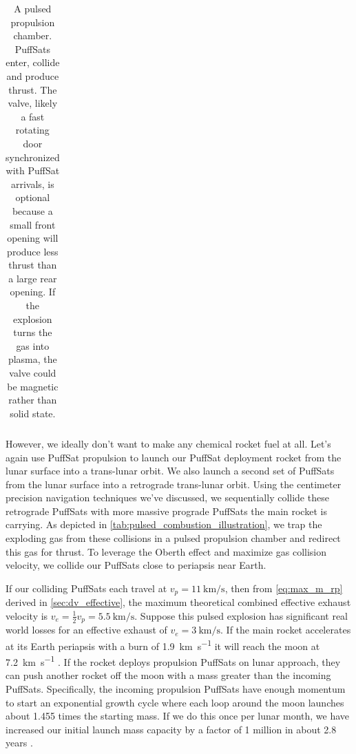 \documentclass{article}
\begin{document}
{\begin{table}[htpb!]
\begin{tabular}{|c|c|}
    \end{tabular}
    \caption{A pulsed propulsion chamber.   PuffSats enter, collide and produce thrust.   The valve, likely a fast rotating door synchronized with PuffSat arrivals, is optional because a small front opening will produce less thrust than a large rear opening.  If the explosion turns the gas into plasma, the valve could be magnetic rather than solid state.}
    \label{tab:pulsed_combustion_illustration}
\end{table}

However, we ideally don't want to make any chemical rocket fuel at all.   Let's again use PuffSat propulsion to launch our PuffSat deployment rocket from the lunar surface into a trans-lunar orbit.   We also launch a second set of PuffSats from the lunar surface into a retrograde trans-lunar orbit.   Using the centimeter precision navigation techniques we've discussed, we sequentially collide these retrograde PuffSats with more massive prograde PuffSats the main rocket is carrying.  As depicted in \autoref{tab:pulsed_combustion_illustration}, we trap the exploding gas from these collisions in a pulsed propulsion chamber and redirect this gas for thrust.   To leverage the Oberth effect and maximize gas collision velocity, we collide our PuffSats close to periapsis near Earth.

If our colliding PuffSats each travel at $v_p=\SI{11}{\kilo\meter\per\second}$, then from \autoref{eq:max_m_rp} derived in \autoref{sec:dv_effective},  the maximum theoretical combined effective exhaust velocity is $v_e = \frac{1}{2}v_p = \SI {5.5}{\kilo\meter\per\second}$.  Suppose this pulsed explosion has significant real world losses for an effective exhaust of $v_e = \SI{3}{\kilo\meter\per\second}$.   If the main rocket accelerates at its Earth periapsis with a burn of \SI{1.9}{\kilo\meter\per\second} it will reach the moon at \SI{7.2}{\kilo\meter\per\second} \cite{Katz_aim_is_all_you_need_2025}.   If the rocket deploys propulsion PuffSats on lunar approach, they can push another rocket off the moon with a mass greater than the incoming PuffSats. Specifically, the incoming propulsion PuffSats have enough momentum to start an exponential growth cycle where each loop around the moon launches about 1.455 times the starting mass.   If we do this once per lunar month, we have increased our initial launch mass capacity by a factor of 1 million in about 2.8 years \cite{Katz_aim_is_all_you_need_2025}. 

}
\end{document}

